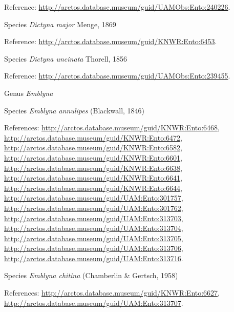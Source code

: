 \documentclass[9pt, article]{memoir}
\begin{document}
\begin{multicols}{2}
\vspace{6pt}Reference: 
\url{http://arctos.database.museum/guid/UAMObs:Ento:240226}.

\vspace{6pt}\noindent\hspace{36pt}Species \textit{Dictyna major} Menge, 1869


\vspace{6pt}Reference: 
\url{http://arctos.database.museum/guid/KNWR:Ento:6453}.

\vspace{6pt}\noindent\hspace{36pt}Species \textit{Dictyna uncinata} Thorell, 1856


\vspace{6pt}Reference: 
\url{http://arctos.database.museum/guid/UAMObs:Ento:239455}.

\vspace{6pt}\noindent\hspace{30pt}Genus \textit{Emblyna}


\vspace{6pt}\noindent\hspace{36pt}Species \textit{Emblyna annulipes} (Blackwall, 1846)


\vspace{6pt}References: 
\url{http://arctos.database.museum/guid/KNWR:Ento:6468}, 
\url{http://arctos.database.museum/guid/KNWR:Ento:6472}, 
\url{http://arctos.database.museum/guid/KNWR:Ento:6582}, 
\url{http://arctos.database.museum/guid/KNWR:Ento:6601}, 
\url{http://arctos.database.museum/guid/KNWR:Ento:6638}, 
\url{http://arctos.database.museum/guid/KNWR:Ento:6641}, 
\url{http://arctos.database.museum/guid/KNWR:Ento:6644}, 
\url{http://arctos.database.museum/guid/UAM:Ento:301757}, 
\url{http://arctos.database.museum/guid/UAM:Ento:301762}, 
\url{http://arctos.database.museum/guid/UAM:Ento:313703}, 
\url{http://arctos.database.museum/guid/UAM:Ento:313704}, 
\url{http://arctos.database.museum/guid/UAM:Ento:313705}, 
\url{http://arctos.database.museum/guid/UAM:Ento:313706}, 
\url{http://arctos.database.museum/guid/UAM:Ento:313716}.

\vspace{6pt}\noindent\hspace{36pt}Species \textit{Emblyna chitina} (Chamberlin \& Gertsch, 1958)


\vspace{6pt}References: 
\url{http://arctos.database.museum/guid/KNWR:Ento:6627}, 
\url{http://arctos.database.museum/guid/UAM:Ento:313707}.


\end{multicols}
\end{document}
